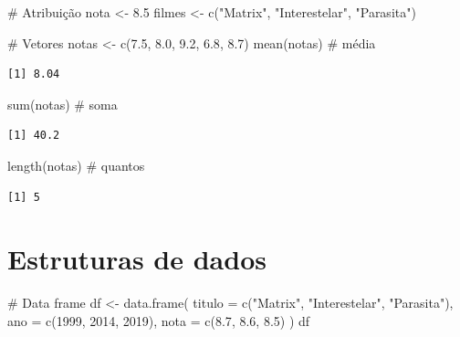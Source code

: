 \documentclass[
  letterpaper,
]{scrbook}
\newenvironment{Shaded}{\begin{snugshade}}{\end{snugshade}}
\newcommand{\AttributeTok}[1]{\textcolor[rgb]{0.40,0.45,0.13}{#1}}
\newcommand{\CommentTok}[1]{\textcolor[rgb]{0.37,0.37,0.37}{#1}}
\newcommand{\DecValTok}[1]{\textcolor[rgb]{0.68,0.00,0.00}{#1}}
\newcommand{\FloatTok}[1]{\textcolor[rgb]{0.68,0.00,0.00}{#1}}
\newcommand{\FunctionTok}[1]{\textcolor[rgb]{0.28,0.35,0.67}{#1}}
\newcommand{\NormalTok}[1]{\textcolor[rgb]{0.00,0.23,0.31}{#1}}
\newcommand{\OtherTok}[1]{\textcolor[rgb]{0.00,0.23,0.31}{#1}}
\newcommand{\StringTok}[1]{\textcolor[rgb]{0.13,0.47,0.30}{#1}}
\begin{document}
\begin{Shaded}
\begin{Highlighting}[]
\CommentTok{\# Atribuição}
\NormalTok{nota }\OtherTok{\textless{}{-}} \FloatTok{8.5}
\NormalTok{filmes }\OtherTok{\textless{}{-}} \FunctionTok{c}\NormalTok{(}\StringTok{"Matrix"}\NormalTok{, }\StringTok{"Interestelar"}\NormalTok{, }\StringTok{"Parasita"}\NormalTok{)}

\CommentTok{\# Vetores}
\NormalTok{notas }\OtherTok{\textless{}{-}} \FunctionTok{c}\NormalTok{(}\FloatTok{7.5}\NormalTok{, }\FloatTok{8.0}\NormalTok{, }\FloatTok{9.2}\NormalTok{, }\FloatTok{6.8}\NormalTok{, }\FloatTok{8.7}\NormalTok{)}
\FunctionTok{mean}\NormalTok{(notas)  }\CommentTok{\# média}
\end{Highlighting}
\end{Shaded}

\begin{verbatim}
[1] 8.04
\end{verbatim}

\begin{Shaded}
\begin{Highlighting}[]
\FunctionTok{sum}\NormalTok{(notas)   }\CommentTok{\# soma}
\end{Highlighting}
\end{Shaded}

\begin{verbatim}
[1] 40.2
\end{verbatim}

\begin{Shaded}
\begin{Highlighting}[]
\FunctionTok{length}\NormalTok{(notas) }\CommentTok{\# quantos}
\end{Highlighting}
\end{Shaded}

\begin{verbatim}
[1] 5
\end{verbatim}

\section*{Estruturas de dados}\label{estruturas-de-dados}


\begin{Shaded}
\begin{Highlighting}[]
\CommentTok{\# Data frame}
\NormalTok{df }\OtherTok{\textless{}{-}} \FunctionTok{data.frame}\NormalTok{(}
  \AttributeTok{titulo =} \FunctionTok{c}\NormalTok{(}\StringTok{"Matrix"}\NormalTok{, }\StringTok{"Interestelar"}\NormalTok{, }\StringTok{"Parasita"}\NormalTok{),}
  \AttributeTok{ano =} \FunctionTok{c}\NormalTok{(}\DecValTok{1999}\NormalTok{, }\DecValTok{2014}\NormalTok{, }\DecValTok{2019}\NormalTok{),}
  \AttributeTok{nota =} \FunctionTok{c}\NormalTok{(}\FloatTok{8.7}\NormalTok{, }\FloatTok{8.6}\NormalTok{, }\FloatTok{8.5}\NormalTok{)}
\NormalTok{)}
\NormalTok{df}
\end{Highlighting}
\end{Shaded}
\end{document}
